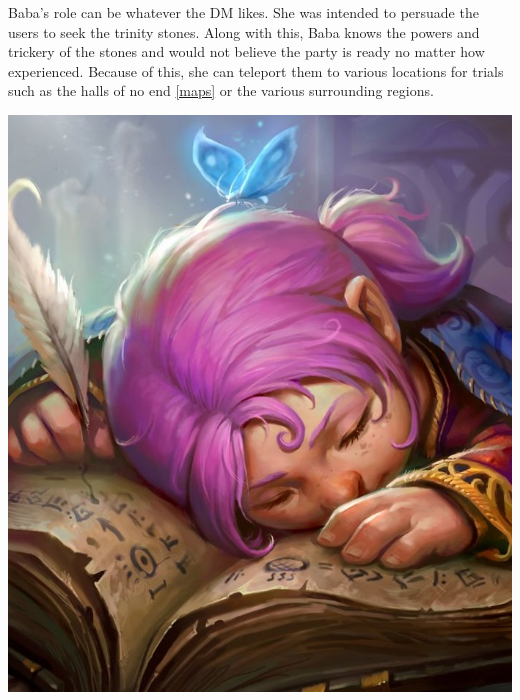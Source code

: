 Baba's role can be whatever the DM likes. She was intended to persuade the users to seek the trinity stones. Along with this, Baba knows the powers and trickery of the stones and would not believe the party is ready no matter how experienced. Because of this, she can teleport them to various locations for trials such as the halls of no end \ref{maps} or the various surrounding regions. 

\begin{center}
	\includegraphics[width=0.5\linewidth]{img/baba.jpg}
\end{center}

